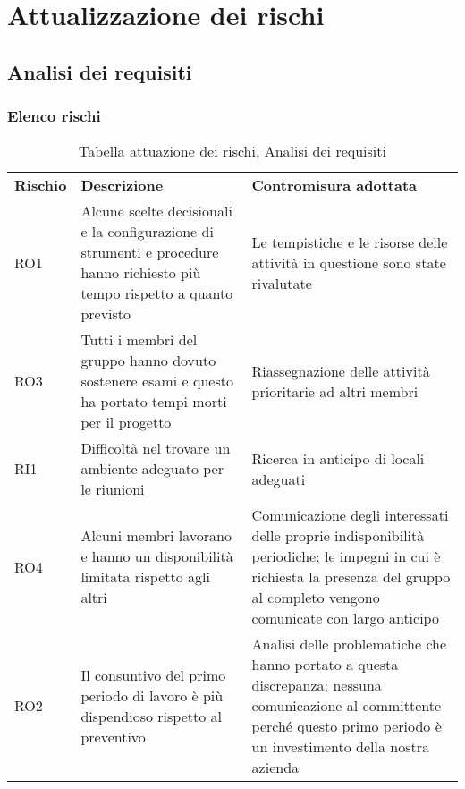 \section{Attualizzazione dei rischi}
\subsection{Analisi dei requisiti}
\subsubsection{Elenco rischi}
\begin{table}[h]
\caption{Tabella attuazione dei rischi, Analisi dei requisiti}
\begin{center}
\begin{tabular}{p{2cm}p{6cm}p{6cm}}
\textbf{Rischio} & \textbf{Descrizione}                                                                                                        & \textbf{Contromisura adottata}                                                                                                                                                   \\
RO1              & Alcune scelte decisionali e la configurazione di strumenti e procedure hanno richiesto più tempo rispetto a quanto previsto & Le tempistiche e le risorse delle attività in questione sono state rivalutate                                                                                                    \\
RO3              & Tutti i membri del gruppo hanno dovuto sostenere esami e questo ha portato tempi morti per il progetto                      & Riassegnazione delle attività prioritarie ad altri membri                                                                                                                        \\
RI1              & Difficoltà nel trovare un ambiente adeguato per le riunioni                                                                 & Ricerca in anticipo di locali adeguati                                                                                                                                           \\
RO4              & Alcuni membri lavorano e hanno un disponibilità limitata rispetto agli altri                                                & Comunicazione degli interessati delle proprie indisponibilità periodiche; le impegni in cui è richiesta la presenza del gruppo al completo vengono comunicate con largo anticipo \\
RO2              & Il consuntivo del primo periodo di lavoro è più dispendioso rispetto al preventivo                                          & Analisi delle problematiche che hanno portato a questa discrepanza; nessuna comunicazione al committente perché questo primo periodo è un investimento della nostra azienda     
\end{tabular}
\end{center}
\end{table}

